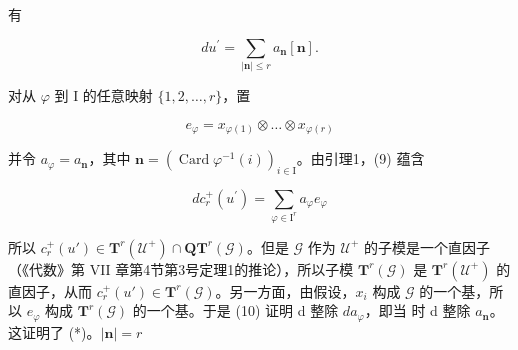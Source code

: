 有

\[
d u ^ {\prime} = \sum_ {| \mathbf {n} | \leq r} a _ {\mathbf {n}} [ \mathbf {n} ].\tag{9}
\]

对从 \(\varphi\) 到 I 的任意映射 \(\{1,2,\ldots,r\}\)，置

\[
e _ {\varphi} = x _ {\varphi (1)} \otimes \dots \otimes x _ {\varphi (r)}
\]

并令 \(a_{\varphi} = a_{\mathbf{n}}\)，其中 \(\mathbf{n} = (\operatorname{Card}\varphi^{-1}(i))_{i\in \mathrm{I}}\)。由引理1，(9) 蕴含

\[
d c _ {r} ^ {+} (u ^ {\prime}) = \sum_ {\varphi \in \mathrm{I} ^ {r}} a _ {\varphi} e _ {\varphi}\tag{10}
\]

所以 \(c_r^+(u') \in \mathbf{T}^r(\mathcal{U}^+) \cap \mathbf{Q}\mathbf{T}^r(\mathcal{G})\)。但是 \(\mathcal{G}\) 作为 \(\mathcal{U}^+\) 的子模是一个直因子（《代数》第 VII 章第4节第3号定理1的推论），所以子模 \(\mathbf{T}^r(\mathcal{G})\) 是 \(\mathbf{T}^r(\mathcal{U}^+)\) 的直因子，从而 \(c_r^+(u') \in \mathbf{T}^r(\mathcal{G})\)。另一方面，由假设，\(x_i\) 构成 \(\mathcal{G}\) 的一个基，所以 \(e_\varphi\) 构成 \(\mathbf{T}^r(\mathcal{G})\) 的一个基。于是 (10) 证明 d 整除 \(d\)\(a_\varphi\)，即当  时 d 整除 \(a_{\mathbf{n}}\)。这证明了 (*)。\(|\mathbf{n}| = r\)
\relax{}
